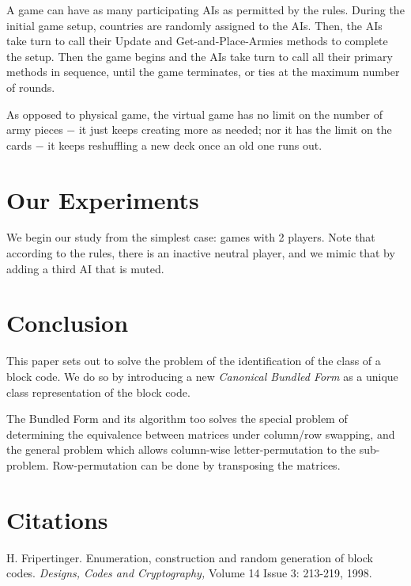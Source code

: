 \documentclass[12pt]{article}  %
\begin{document}
A game can have as many participating AIs as permitted by the rules. During the initial game setup, countries are randomly assigned to the AIs. Then, the AIs take turn to call their Update and Get-and-Place-Armies methods to complete the setup. Then the game begins and the AIs take turn to call all their primary methods in sequence, until the game terminates, or ties at the maximum number of rounds.

As opposed to physical game, the virtual game has no limit on the number of army pieces $-$ it just keeps creating more as needed; nor it has the limit on the cards $-$ it keeps reshuffling a new deck once an old one runs out.




\section{Our Experiments}

We begin our study from the simplest case: games with 2 players. Note that according to the rules, there is an inactive neutral player, and we mimic that by adding a third AI that is muted.






\section{Conclusion}
This paper sets out to solve the problem of the identification of the class of a block code. We do so by introducing a new \emph{Canonical Bundled Form} as a unique class representation of the block code.


The Bundled Form and its algorithm too solves the special problem of determining the equivalence between matrices under column/row swapping, and the general problem which allows column-wise letter-permutation to the sub-problem. Row-permutation can be done by transposing the matrices.




\section{Citations}


H. Fripertinger. Enumeration, construction and random generation of block codes. \emph{Designs, Codes and Cryptography,} Volume 14 Issue 3: 213-219, 1998.
\end{document}
